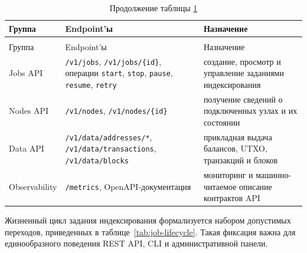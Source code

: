 \begin{footnotesize}
\setlength{\tabcolsep}{3pt}
\begin{longtable}{|p{}|p{}|p{}|}
    \caption{Группы REST API системы}\label{tab:api-groups}\\ \hline
    Группа & Endpoint'ы & Назначение \\ \hline
    \endfirsthead
    \caption*{Продолжение таблицы \ref{tab:api-groups}}\\ \hline
    Группа & Endpoint'ы & Назначение \\ \hline
    \endhead
    \hline
    \endfoot
    \hline
    \endlastfoot
    Jobs API &
    \texttt{/v1/jobs}, \texttt{/v1/jobs/\{id\}}, операции \texttt{start}, \texttt{stop}, \texttt{pause}, \texttt{resume}, \texttt{retry} &
    создание, просмотр и управление заданиями индексирования \\ \hline
    Nodes API &
    \texttt{/v1/nodes}, \texttt{/v1/nodes/\{id\}} &
    получение сведений о подключенных узлах и их состоянии \\ \hline
    Data API &
    \texttt{/v1/data/addresses/*}, \texttt{/v1/data/transactions}, \texttt{/v1/data/blocks} &
    прикладная выдача балансов, UTXO, транзакций и блоков \\ \hline
    Observability &
    \texttt{/metrics}, OpenAPI-документация &
    мониторинг и машинно-читаемое описание контрактов API \\ \hline
\end{longtable}
\end{footnotesize}

Жизненный цикл задания индексирования формализуется набором допустимых
переходов, приведенных в таблице~\ref{tab:job-lifecycle}. Такая фиксация важна
для единообразного поведения REST API, CLI и административной панели.

